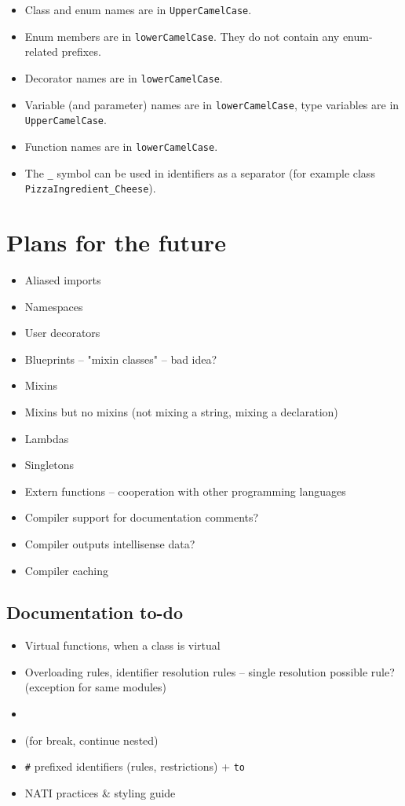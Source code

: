 \begin{itemize}
	\item Class and enum names are in \verb|UpperCamelCase|.
	\item Enum members are in \verb|lowerCamelCase|. They do not contain any enum-related prefixes.
	\item Decorator names are in \verb|lowerCamelCase|.
	\item Variable (and parameter) names are in \verb|lowerCamelCase|, type variables are in \verb|UpperCamelCase|.
	\item Function names are in \verb|lowerCamelCase|.
	\item The \verb|_| symbol can be used in identifiers as a separator (for example class \verb|PizzaIngredient_Cheese|).
\end{itemize}

\chapter{Plans for the future}
\begin{itemize}
	\item Aliased imports
	\item Namespaces
	\item User decorators
	\item Blueprints -- "mixin classes" -- bad idea?
	\item Mixins
	\item Mixins but no mixins (not mixing a string, mixing a declaration)
	\item Lambdas
	\item Singletons
	\item Extern functions -- cooperation with other programming languages
	\item Compiler support for documentation comments?
	\item Compiler outputs intellisense data?
	\item Compiler caching
\end{itemize}

\section{Documentation to-do}
\begin{itemize}
	\item Virtual functions, when a class is virtual
	\item Overloading rules, identifier resolution rules -- single resolution possible rule? (exception for same modules)
	\item {}
	\item {} (for break, continue nested)
	\item \verb|#| prefixed identifiers (rules, restrictions) + \verb|to|
	\item NATI practices \& styling guide
\end{itemize}

